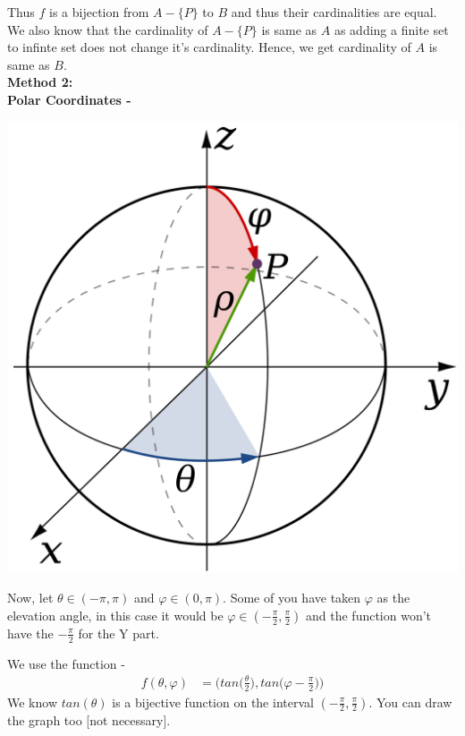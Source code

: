 \documentclass[12pt]{scrartcl}
\begin{document}
Thus $f$ is a bijection from $A - \{P\}$ to $B$ and thus their cardinalities are equal. We also know that the cardinality of $A - \{P\}$ is same as $A$ as adding a finite set to infinte set does not change it's cardinality. Hence, we get cardinality of $A$ is same as $B$.
\\ \textbf{Method 2:}
\\ \textbf{Polar Coordinates - }
\begin{center}
    \includegraphics[width=0.5\linewidth]{znpVq.png}
\end{center}
Now, let $\theta \in (-\pi,\pi)$ and $\varphi \in (0,\pi)$. Some of you have taken $\varphi$ as the elevation angle, in this case it would be $\varphi \in (-\frac{\pi}{2},\frac{\pi}{2})$ and the function won't have the $-\frac{\pi}{2}$ for the Y part.

We use the function - 
\begin{align*}
    f(\theta,\varphi) &= \Bigg(tan\bigg(\frac{\theta}{2}\bigg),tan\bigg(\varphi - \frac{\pi}{2}\bigg)\Bigg)
\end{align*}
We know $tan(\theta)$ is a bijective function on the interval $(-\frac{\pi}{2},\frac{\pi}{2})$. You can draw the graph too [not necessary].
\end{document}
